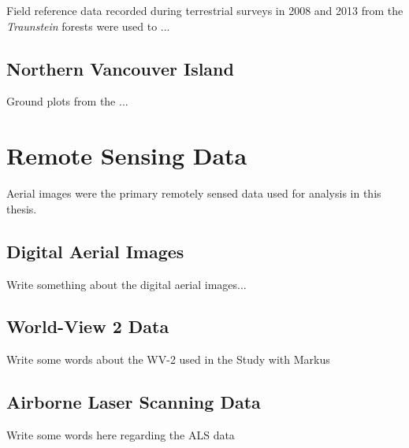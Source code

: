 Field reference data recorded during terrestrial surveys in 2008 and 2013 from the \emph{Traunstein} forests were used to ...

\subsection{Northern Vancouver Island}

Ground plots from the ...


\section{Remote Sensing Data}\label{sec:RemSensData}

Aerial images were the primary remotely sensed data used for analysis in this thesis.

\subsection{Digital Aerial Images}

Write something about the digital aerial images...

\subsection{World-View 2 Data}

Write some words about the WV-2 used in the Study with Markus

\subsection{Airborne Laser Scanning Data}

Write some words here regarding the ALS data

